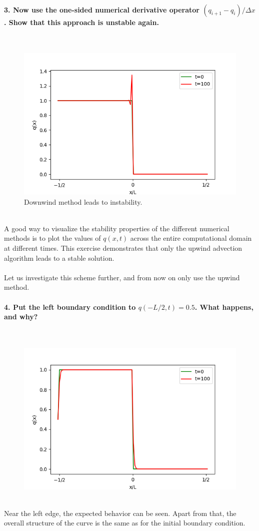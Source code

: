\paragraph{3. Now use the one-sided numerical derivative 
    operator $(q_{i+1}-q_i)/\Delta x$. Show that this 
    approach is unstable again.
} \ \\
    \begin{figure}[h!]
        \centering
        \includegraphics[width=.6\textwidth]{../figures/downwind_3.png}
        \caption{Downwind method leads to instability.}
    \end{figure} \ \\ 

\newpage \noindent
A good way to visualize the stability properties of the 
different numerical methods is to plot the values of 
$q(x,t)$ across the entire computational domain at 
different times. This exercise demonstrates that only the 
upwind advection algorithm leads to a stable solution. \\
\\
Let us investigate this scheme further, and from now on 
only use the upwind method.

\paragraph{4. Put the left boundary condition to 
    $q(-L/2,t)=0.5$. What happens, and why?
} \ \\
    \begin{figure}[h!]
        \centering
        \includegraphics[width=.6\textwidth]{../figures/upwind_4.png}
    \end{figure} \ \\ 
    Near the left edge, the expected behavior can 
    be seen. Apart from that, the overall structure 
    of the curve is the same as for the initial 
    boundary condition. 

